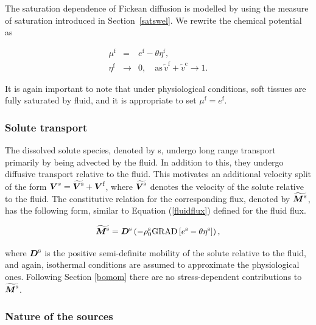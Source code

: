 The saturation dependence of Fickean diffusion is modelled by using
the measure of saturation introduced in Section~\ref{satswel}. We
rewrite the chemical potential as

\begin{eqnarray}
\mu^\mathrm{f} &=&  
e^\mathrm{f} - \theta\eta^\mathrm{f},\nonumber\\
\eta^\mathrm{f} &\to& 0, \quad \mbox{as}\, \tilde{v}^\mathrm{f} +
\tilde{v}^\mathrm{c} \to 1.
\label{fickeanmobility}
\end{eqnarray}

\noindent It is again important to note that under physiological
conditions, soft tissues are fully saturated by fluid, and it is
appropriate to set $\mu^\mathrm{f} = e^\mathrm{f}$.

\subsubsection{Solute transport}
\label{solute-transport}

The dissolved solute species, denoted by s, undergo long range
transport primarily by being 
advected by the fluid. In addition to this, they undergo diffusive
transport relative to the fluid. This motivates an additional velocity
split of the form $\mbox{\boldmath$ V$}^s=\widetilde{\mbox{\boldmath$ V$}^\mathrm{s}}+\mbox{\boldmath$ V$}^\mathrm{f}$,
where $\widetilde{\mbox{\boldmath$ V$}^\mathrm{s}}$ denotes the velocity of the solute
relative to the fluid. The constitutive relation for the corresponding
flux, denoted by $\widetilde{\mbox{\boldmath$ M$}^s}$, has the following form, similar
to Equation (\ref {fluidflux}) defined for the fluid flux.


\begin{equation}
\widetilde{\mbox{\boldmath$ M$}^\mathrm{s}} = \mbox{\boldmath$ D$}^\mathrm{s}\left(
- \rho^\mathrm{s}_0\mathrm{\small{GRAD}}\left[e^\mathrm{s} -
 \theta\eta^\mathrm{s}\right]\right),
\label{soluteflux}
\end{equation}

\noindent where $\mbox{\boldmath$ D$}^\mathrm{s}$ is the positive semi-definite
mobility of the solute relative to the fluid, and again, isothermal
conditions are assumed to approximate the physiological
ones. Following Section \ref{bomom} there are no stress-dependent
contributions to $\widetilde{\mbox{\boldmath$ M$}^\mathrm{s}}$.

\subsubsection{Nature of the sources}
\label{nature-of-sources}

